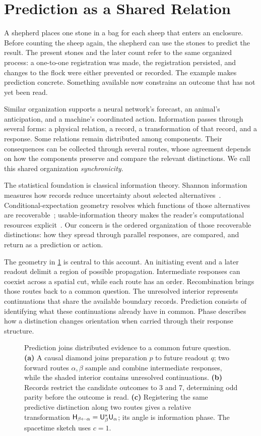 \section{Prediction as a Shared Relation}
\label{sec:prediction}
A shepherd places one stone in a bag for each sheep that enters an enclosure. Before counting the sheep again, the shepherd can use the stones to predict the result. The present stones and the later count refer to the same organized process: a one-to-one registration was made, the registration persisted, and changes to the flock were either prevented or recorded. The example makes prediction concrete. Something available now constrains an outcome that has not yet been read.

Similar organization supports a neural network's forecast, an animal's anticipation, and a machine's coordinated action. Information passes through several forms: a physical relation, a record, a transformation of that record, and a response. Some relations remain distributed among components. Their consequences can be collected through several routes, whose agreement depends on how the components preserve and compare the relevant distinctions. We call this shared organization \emph{synchronicity}.

The statistical foundation is classical information theory. Shannon information measures how records reduce uncertainty about selected alternatives~\citep{shannon1948}. Conditional-expectation geometry resolves which functions of those alternatives are recoverable~\citep{calmon2017}; usable-information theory makes the reader's computational resources explicit~\citep{xu2020}. Our concern is the ordered organization of those recoverable distinctions: how they spread through parallel responses, are compared, and return as a prediction or action.

The geometry in \cref{fig:diamond} is central to this account. An initiating event and a later readout delimit a region of possible propagation. Intermediate responses can coexist across a spatial cut, while each route has an order. Recombination brings those routes back to a common question. The unresolved interior represents continuations that share the available boundary records. Prediction consists of identifying what these continuations already have in common. Phase describes how a distinction changes orientation when carried through their response structure.

\begin{figure}[t]
\centering

\caption{Prediction joins distributed evidence to a common future question. \textbf{(a)} A causal diamond joins preparation \(p\) to future readout \(q\); two forward routes \(\alpha,\beta\) sample and combine intermediate responses, while the shaded interior contains unresolved continuations. \textbf{(b)} Records restrict the candidate outcomes to 3 and 7, determining odd parity before the outcome is read. \textbf{(c)} Registering the same predictive distinction along two routes gives a relative transformation \(\mathsf H_{\beta\leftarrow\alpha}=\mathsf U_\beta^*\mathsf U_\alpha\); its angle is information phase. The spacetime sketch uses \(c=1\).}
\label{fig:diamond}
\end{figure}

